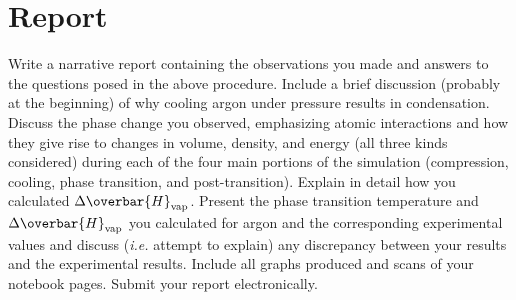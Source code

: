 \documentclass{article}
\begin{document}
\section{Report}
Write a narrative report containing the observations you made and answers to the questions posed in the above procedure.
Include a brief discussion (probably at the beginning) of why cooling argon under pressure results in condensation.
Discuss the phase change you observed, emphasizing atomic interactions and how they give rise to changes in volume, density, and energy (all three kinds considered) during each of the four main portions of the simulation (compression, cooling, phase transition, and post-transition).
Explain in detail how you calculated $\increment \overbar{H}\subword{vap}$.
Present the phase transition temperature and $\increment \overbar{H}\subword{vap}$ you calculated for argon and the corresponding experimental values and discuss (\emph{i.e.} attempt to explain) any discrepancy between your results and the experimental results.
Include all graphs produced and scans of your notebook pages.
Submit your report electronically.
\end{document}
